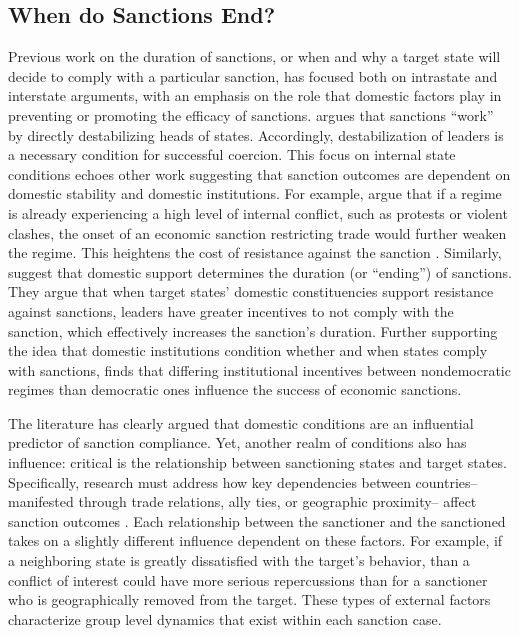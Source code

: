 \subsection*{When do Sanctions End?}
\label{lit}

Previous work on the duration of sanctions, or when and why a target state will decide to comply with a particular sanction, has focused both on intrastate and interstate arguments, with an emphasis on the role that domestic factors play in preventing or promoting the efficacy of sanctions. \cite{marinov2005} argues that sanctions ``work'' by directly destabilizing heads of states. Accordingly, destabilization of leaders is a necessary condition for successful coercion.  This focus on internal state conditions echoes other work suggesting that sanction outcomes are dependent on domestic stability and domestic institutions. For example, {\cite{dashti1997}} argue that if a regime is already experiencing a high level of internal conflict, such as protests or violent clashes, the onset of an economic sanction restricting trade would further weaken the regime. This heightens the cost of resistance against the sanction \citep{dashti1997}. Similarly, \cite{dorussen2001} suggest that domestic support determines the duration (or ``ending'') of sanctions. They argue that when target states' domestic constituencies support resistance against sanctions, leaders have greater incentives to not comply with the sanction, which effectively increases the sanction's duration. Further supporting the idea that domestic institutions condition whether and when states comply with sanctions, \cite{lektzian2007} finds that differing institutional incentives between nondemocratic regimes than democratic ones influence the success of economic sanctions. 

The literature has clearly argued that domestic conditions are an influential predictor of sanction compliance. Yet, another realm of conditions also has influence: critical is the relationship between sanctioning states and target states. Specifically, research must address how key dependencies between countries--manifested through trade relations, ally ties, or geographic proximity-- affect sanction outcomes \citep{mclean2010friends}. Each relationship between the sanctioner and the sanctioned takes on a slightly different influence dependent on these factors. For example, if a neighboring state is greatly dissatisfied with the target's behavior, than a conflict of interest could have more serious repercussions than for a sanctioner who is geographically removed from the target. These types of external factors characterize group level dynamics that exist within each sanction case. 

